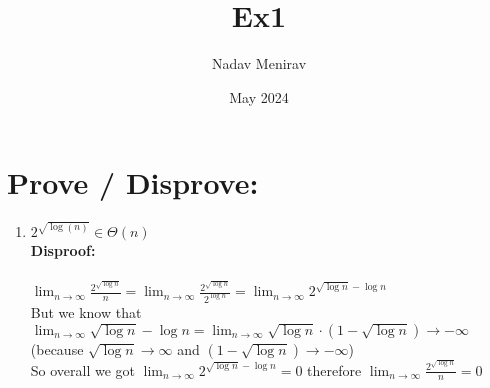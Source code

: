 \documentclass{article}
\title{Ex1}
\author{Nadav Menirav}
\date{May 2024}
\begin{document}
\maketitle

\section{Prove / Disprove: }
\begin{enumerate}
    \item $2^{\sqrt{\log(n)}}\in\Theta(n)$\\
    
    \textbf{Disproof:}\\
    \\
    $\displaystyle\lim_{n\to\infty}{\frac{2^{\sqrt{\log{n}}}}{n}}=\displaystyle\lim_{n\to\infty}{\frac{2^{\sqrt{\log{n}}}}
    {2^{\log{n}}}}=\displaystyle\lim_{n\to\infty}{2^{\sqrt{\log{n}}-\log{n}}}$\\
    
    But we know that $\displaystyle\lim_{n\to\infty}{\sqrt{\log{n}}-\log{n}}=\displaystyle\lim_{n\to\infty}{\sqrt{\log{n}}\cdot\left(1-\sqrt{\log{n}}\right)\longrightarrow-\infty}$
    (because $\sqrt{\log{n}}\longrightarrow\infty$ and $\left(1-\sqrt{\log{n}}\right)\longrightarrow-\infty$)\\

    So overall we got $\displaystyle\lim_{n\to\infty}{2^{\sqrt{\log{n}}-\log{n}}}=0$ therefore $\displaystyle\lim_{n\to\infty}{\frac{2^{\sqrt{\log{n}}}}{n}}=0$\\
    

\end{enumerate}
\end{document}
